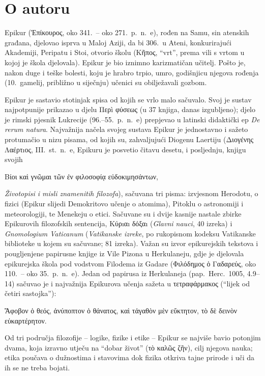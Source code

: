 \section*{O autoru}

Epikur (Ἐπίκουρος, oko 341.\ – oko 271.\ p.~n.~e), rođen na Samu, sin atenskih građana, djelovao isprva u Maloj Aziji, da bi 306.\ u Ateni, konkurirajući Akademiji, Peripatu i Stoi, otvorio školu (Κῆπος, ``vrt'', prema vili s vrtom u kojoj je škola djelovala). Epikur je bio iznimno karizmatičan učitelj. Pošto je, nakon duge i teške bolesti, koju je hrabro trpio, umro, godišnjicu njegova rođenja (10.\ gamelij, približno u siječnju) učenici su obilježavali gozbom.

Epikur je sastavio stotinjak spisa od kojih se vrlo malo sačuvalo. Svoj je sustav najpotpunije prikazao u djelu Περì φύσεως (u 37 knjiga, danas izgubljeno); djelo je rimski pjesnik Lukrecije (96.–55.\ p.~n.~e) prepjevao u latinski didaktički ep \textit{De rerum natura}. Najvažnija načela svojeg sustava Epikur je jednostavno i sažeto protumačio u nizu pisama, od kojih su, zahvaljujući Diogenu Laertiju (Διογένης Λαέρτıος, III.\ st.\ n.~e, Epikuru je posvetio čitavu desetu, i posljednju, knjigu svojih \begin{greek}Βίοι καὶ γνῶμαι τῶν ἐν φιλοσοφίᾳ εὐδοκιμησάντων,\end{greek} \textit{Životopisi i misli znamenitih filozofa}), sačuvana tri pisma: izvjesnom Herodotu, o fizici (Epikur slijedi Demokritovo učenje o atomima), Pitoklu o astronomiji i meteorologiji, te Menekeju o etici. Sačuvane su i dvije kasnije nastale zbirke Epikurovih filozofskih sentencija, Κύρıαı δόξαı (\textit{Glavni nauci}, 40 izreka) i \textit{Gnomologium Vaticanum} (\textit{Vatikanske izreke}, po rukopisnom kodeksu Vatikanske biblioteke u kojem su sačuvane; 81 izreka). Važan su izvor epikurejskih tekstova i pougljenjene papirusne knjige iz Vile Pizona u Herkulaneju, gdje je djelovala epikurejska škola pod vodstvom Filodema iz Gadare (Φιλόδημος ὁ Γαδαρεύς, oko 110.\ – oko 35.\ p.~n.~e). Jedan od papirusa iz Herkulaneja (pap.\ Herc.\ 1005, 4.9–14) sačuvao je i najvažnija Epikurova učenja sažeta u τετραφάρμακος (``lijek od četiri sastojka''): \begin{greek}Ἄφοβον ὁ θεός, ἀνύποπτον ὁ θάνατος, καὶ τἀγαθὸν μὲν εὔκτητον, τὸ δὲ δεινὸν εὐκαρτέρητον.\end{greek}

Od tri područja filozofije – logike, fizike i etike – Epikur se najviše bavio potonjim dvama, koja izravno utječu na ``dobar život'' (τὸ καλῶς ζῆν), cilj njegova nauka; etika poučava o dužnostima i stavovima dok fizika otkriva tajne prirode i uči da ih se ne treba bojati. 

